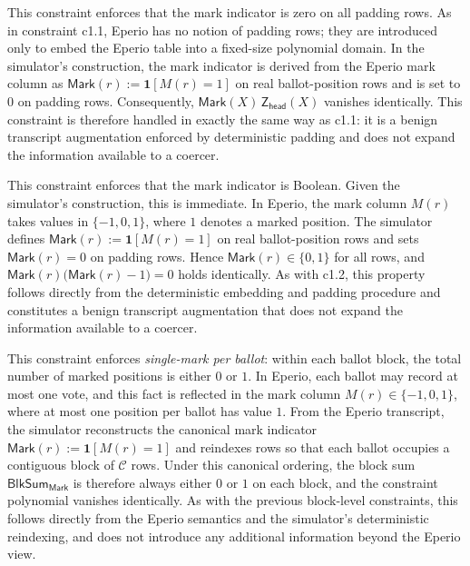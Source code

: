 
This constraint enforces that the mark indicator is zero on all padding rows. As in constraint c1.1, Eperio has no notion of
padding rows; they are introduced only to embed the Eperio table into a fixed-size polynomial domain. In the simulator’s
construction, the mark indicator is derived from the Eperio mark column as
$\mathsf{Mark}(r):=\mathbf{1}[M(r)=1]$ on real ballot-position rows and is set to $0$ on padding rows. Consequently,
$\mathsf{Mark}(X)\,\mathsf{Z}_{\mathsf{head}}(X)$ vanishes identically. This constraint is therefore handled in exactly the
same way as c1.1: it is a benign transcript augmentation enforced by deterministic padding and does not expand the
information available to a coercer.


This constraint enforces that the mark indicator is Boolean. Given the simulator’s construction, this is immediate.
In Eperio, the mark column $M(r)$ takes values in $\{-1,0,1\}$, where $1$ denotes a marked position. The simulator defines
$\mathsf{Mark}(r):=\mathbf{1}[M(r)=1]$ on real ballot-position rows and sets $\mathsf{Mark}(r)=0$ on padding rows. Hence
$\mathsf{Mark}(r)\in\{0,1\}$ for all rows, and $\mathsf{Mark}(r)\bigl(\mathsf{Mark}(r)-1\bigr)=0$ holds identically.
As with c1.2, this property follows directly from the deterministic embedding and padding procedure and constitutes a
benign transcript augmentation that does not expand the information available to a coercer.


This constraint enforces \emph{single-mark per ballot}: within each ballot block, the total number of marked positions is
either $0$ or $1$. In Eperio, each ballot may record at most one vote, and this fact is reflected in the mark column
$M(r)\in\{-1,0,1\}$, where at most one position per ballot has value $1$. From the Eperio transcript, the simulator
reconstructs the canonical mark indicator $\mathsf{Mark}(r):=\mathbf{1}[M(r)=1]$ and reindexes rows so that each ballot
occupies a contiguous block of $\mathcal{C}$ rows. Under this canonical ordering, the block sum
$\mathsf{BlkSum}_{\mathsf{Mark}}$ is therefore always either $0$ or $1$ on each block, and the constraint polynomial
vanishes identically. As with the previous block-level constraints, this follows directly from the Eperio semantics and
the simulator’s deterministic reindexing, and does not introduce any additional information beyond the Eperio view.

